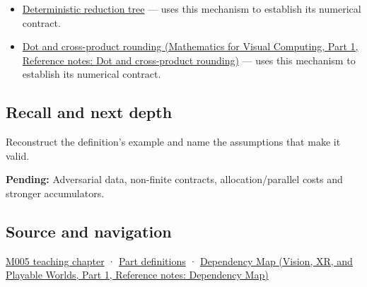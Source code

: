\hypertarget{appendix-df318da57389-used-by}{}

\begin{itemize}
\tightlist
\item
  \hyperref[appendix-4c8e0238e7ee]{Deterministic reduction tree} --- uses this mechanism to establish its numerical contract.
\item
  \href{../02-Mathematics-for-Visual-Computing-P01/main.pdf\#nameddest=appendix-5aef4f13483a}{Dot and cross-product rounding (Mathematics for Visual Computing, Part 1, Reference notes: Dot and cross-product rounding)} --- uses this mechanism to establish its numerical contract.
\end{itemize}

\subsection{Recall and next depth}\label{appendix-df318da57389-recall-and-next-depth}

\hypertarget{appendix-df318da57389-recall-and-next-depth}{}

Reconstruct the definition's example and name the assumptions that make it valid.

\textbf{Pending:} Adversarial data, non-finite contracts, allocation/parallel costs and stronger accumulators.

\subsection{Source and navigation}\label{appendix-df318da57389-source-and-navigation}

\hypertarget{appendix-df318da57389-source-and-navigation}{}

\hyperref[01-foundations-i-ch001-when-arithmetic-meets-uncertainty]{M005 teaching chapter} · \hyperref[appendix-fd090d982a15-m005---parts-77-88]{Part definitions} · \href{../07-Vision-XR-and-Playable-Worlds-P01/main.pdf\#nameddest=appendix-4ad47bdd269a}{Dependency Map (Vision, XR, and Playable Worlds, Part 1, Reference notes: Dependency Map)}
